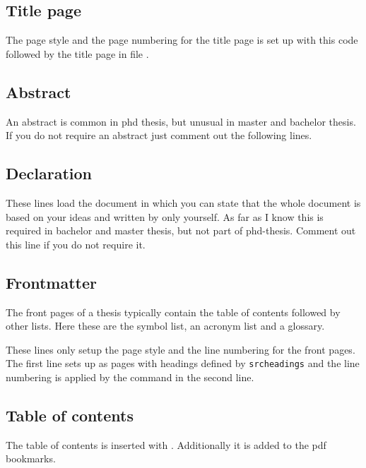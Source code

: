 \subsection{Title page}
The page style and the page numbering for the title page is set up with this code
%
followed by the title page in file .

\subsection{Abstract}
An abstract is common in phd thesis, but unusual in master and bachelor thesis. If you do not require an abstract just comment out the following lines.

\subsection{Declaration}
These lines load the document  in which you can state that the whole document is based on your ideas and written by only yourself. As far as I know this is required in bachelor and master thesis, but not part of phd-thesis. Comment out this line if you do not require it.

\subsection{Frontmatter}
The front pages of a thesis typically contain the table of contents followed by other lists. Here these are the symbol list, an acronym list and a glossary.

These lines only setup the page style and the line numbering for the front pages. The first line sets up as pages with headings defined by \texttt{srcheadings} and the line numbering is applied by the command  in the second line.

\subsection{Table of contents}
The table of contents is inserted with . Additionally it is added to the pdf bookmarks.

